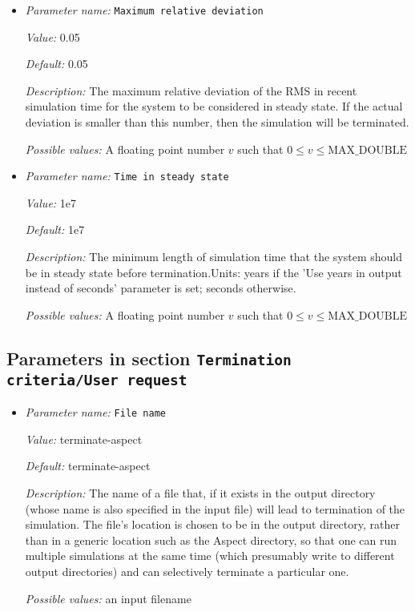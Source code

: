 \begin{itemize}
\item {\it Parameter name:} {\tt Maximum relative deviation}
\label{parameters:Termination criteria/Steady state velocity/Maximum relative deviation}


{\it Value:} 0.05


{\it Default:} 0.05


{\it Description:} The maximum relative deviation of the RMS in recent simulation time for the system to be considered in steady state. If the actual deviation is smaller than this number, then the simulation will be terminated.


{\it Possible values:} A floating point number $v$ such that $0 \leq v \leq \text{MAX\_DOUBLE}$
\item {\it Parameter name:} {\tt Time in steady state}
\label{parameters:Termination criteria/Steady state velocity/Time in steady state}


{\it Value:} 1e7


{\it Default:} 1e7


{\it Description:} The minimum length of simulation time that the system should be in steady state before termination.Units: years if the 'Use years in output instead of seconds' parameter is set; seconds otherwise.


{\it Possible values:} A floating point number $v$ such that $0 \leq v \leq \text{MAX\_DOUBLE}$
\end{itemize}

\subsection{Parameters in section \tt Termination criteria/User request}
\label{parameters:Termination_20criteria/User_20request}

\begin{itemize}
\item {\it Parameter name:} {\tt File name}
\label{parameters:Termination criteria/User request/File name}


{\it Value:} terminate-aspect


{\it Default:} terminate-aspect


{\it Description:} The name of a file that, if it exists in the output directory (whose name is also specified in the input file) will lead to termination of the simulation. The file's location is chosen to be in the output directory, rather than in a generic location such as the Aspect directory, so that one can run multiple simulations at the same time (which presumably write to different output directories) and can selectively terminate a particular one.


{\it Possible values:} an input filename
\end{itemize}
